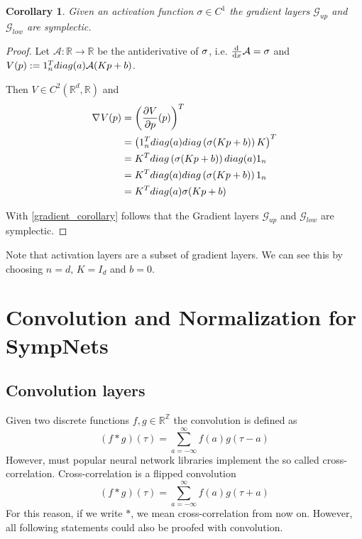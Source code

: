 \documentclass[twoside,a4paper]{article}
\newtheorem{corollary}{Corollary}
\begin{document}
\begin{corollary}
	Given an activation function $\sigma \in C^1$ the gradient layers $\mathcal{G}_{up}$
	and $\mathcal{G}_{low}$ are symplectic.
\end{corollary}
\begin{proof}
	Let $\mathcal{A}: \mathbb{R} \to \mathbb{R}$ be the antiderivative of $\sigma$, 
	i.e. $\frac{\mathrm{d}^{}}{\mathrm{d}x} \mathcal{A} = \sigma$ and
	$V(p) := 1_{n}^Tdiag(a)\mathcal{A}(Kp+b)$.

	Then $V \in C^2(\mathbb{R}^d, \mathbb{R})$ and
	\begin{align*}
		\nabla_{}{V(p)} &= \left(\frac{\partial V}{\partial p}(p)\right)^T \\
		&= \left(1_n^Tdiag(a)diag\left(\sigma(Kp+b)\right)K\right)^T \\
		&= K^Tdiag\left(\sigma(Kp+b)\right)diag(a)1_n \\
		&= K^Tdiag(a)diag\left(\sigma(Kp+b)\right)1_n \\
		&= K^Tdiag(a)\sigma(Kp+b)
	\end{align*}

	With \cref{gradient_corollary} follows that the Gradient layers
	$\mathcal{G}_{up}$ and $\mathcal{G}_{low}$ are symplectic.
\end{proof}

Note that activation layers are a subset of gradient layers. We can see this by choosing
$n=d$, $K=I_d$ and $b=0$.

\section{Convolution and Normalization for SympNets}

\subsection{Convolution layers}


Given two discrete functions $f,g \in \mathbb{R}^\mathbb{Z}$ the convolution is defined as 
\begin{equation*}
	(f*g)(\tau) = \sum^{\infty}_{a=-\infty} f(a) g(\tau - a)
\end{equation*}
However, must popular neural network libraries implement the so called cross-correlation.
Cross-correlation is a flipped convolution
\begin{equation*}
	(f*g)(\tau) = \sum^{\infty}_{a=-\infty} f(a) g(\tau + a)
\end{equation*}
For this reason, if we write $*$, we mean cross-correlation from now on. However, all following statements 
could also be proofed with convolution.
\end{document}
